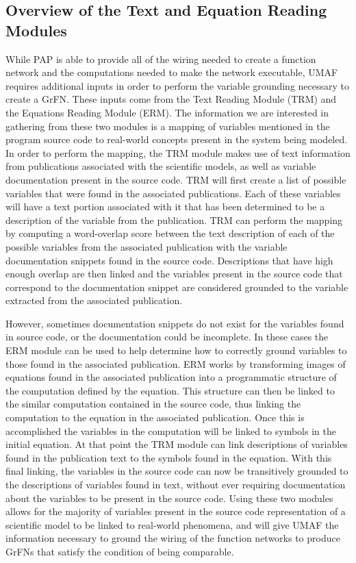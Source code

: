 \subsection{Overview of the Text and Equation Reading Modules \label{sec:ter_overview}}
While PAP is able to provide all of the wiring needed to create a function network and the computations needed to make the network executable, UMAF requires additional inputs in order to perform the variable grounding necessary to create a GrFN.
These inputs come from the Text Reading Module (TRM) and the Equations Reading Module (ERM).
The information we are interested in gathering from these two modules is a mapping of variables mentioned in the program source code to real-world concepts present in the system being modeled.
In order to perform the mapping, the TRM module makes use of text information from publications associated with the scientific models, as well as variable documentation present in the source code.
TRM will first create a list of possible variables that were found in the associated publications.
Each of these variables will have a text portion associated with it that has been determined to be a description of the variable from the publication.
TRM can perform the mapping by computing a word-overlap score between the text description of each of the possible variables from the associated publication with the variable documentation snippets found in the source code.
Descriptions that have high enough overlap are then linked and the variables present in the source code that correspond to the documentation snippet are considered grounded to the variable extracted from the associated publication.

However, sometimes documentation snippets do not exist for the variables found in source code, or the documentation could be incomplete.
In these cases the ERM module can be used to help determine how to correctly ground variables to those found in the associated publication.
ERM works by transforming images of equations found in the associated publication into a programmatic structure of the computation defined by the equation.
This structure can then be linked to the similar computation contained in the source code, thus linking the computation to the equation in the associated publication.
Once this is accomplished the variables in the computation will be linked to symbols in the initial equation.
At that point the TRM module can link descriptions of variables found in the publication text to the symbols found in the equation.
With this final linking, the variables in the source code can now be transitively grounded to the descriptions of variables found in text, without ever requiring documentation about the variables to be present in the source code.
Using these two modules allows for the majority of variables present in the source code representation of a scientific model to be linked to real-world phenomena, and will give UMAF the information necessary to ground the wiring of the function networks to produce GrFNs that satisfy the condition of being comparable.

